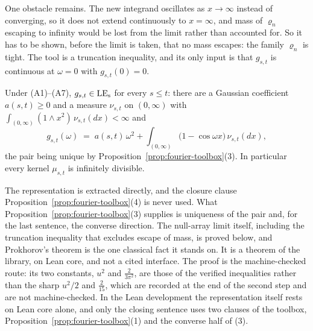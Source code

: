 One obstacle remains. The new integrand oscillates as $x \to \infty$ instead of converging,
so it does not extend continuously to $x = \infty$, and mass of $\varrho_n$ escaping to
infinity would be lost from the limit rather than accounted for. So it has to be shown,
before the limit is taken, that no mass escapes: the family $\varrho_n$ is tight. The tool
is a truncation inequality, and its only input is that $g_{s,t}$ is continuous at
$\omega = 0$ with $g_{s,t}(0) = 0$.

\begin{theorem}\label{thm:increments-levy}
Under (A1)--(A7), $g_{s,t} \in \mathrm{LE}_{\mathrm{s}}$ for every $s \le t$: there are a Gaussian coefficient
$a(s,t) \ge 0$ and a measure $\nu_{s,t}$ on $(0,\infty)$ with
$\int_{(0,\infty)}(1 \wedge x^2)\,\nu_{s,t}(dx) < \infty$ and
\begin{equation}\label{eq:increment-levy}
  g_{s,t}(\omega) \;=\; a(s,t)\,\omega^2
   + \int_{(0,\infty)} \bigl(1 - \cos\omega x\bigr)\,\nu_{s,t}(dx),
\end{equation}
the pair being unique by Proposition~\ref{prop:fourier-toolbox}(3). In particular every kernel
$\mu_{s,t}$ is infinitely divisible.
\end{theorem}

The representation is extracted directly, and the closure clause
Proposition~\ref{prop:fourier-toolbox}(4) is never used. What
Proposition~\ref{prop:fourier-toolbox}(3) supplies is uniqueness of the pair and, for the
last sentence, the converse direction. The null-array limit itself, including the
truncation inequality that excludes escape of mass, is proved below, and Prokhorov's theorem
is the one classical fact it stands on. It is a theorem of the library, on Lean core, and not a
cited interface. The proof is the machine-checked route: its two
constants, $u^2$ and $\frac{2}{3\pi^2}$, are those of the verified inequalities rather
than the sharp $u^2/2$ and $\frac{2}{15}$, which are recorded at the end of the second step
and are not machine-checked. In the Lean development the representation itself rests on
Lean core alone, and only the closing sentence uses two clauses of the toolbox,
Proposition~\ref{prop:fourier-toolbox}(1) and the converse half of (3).

